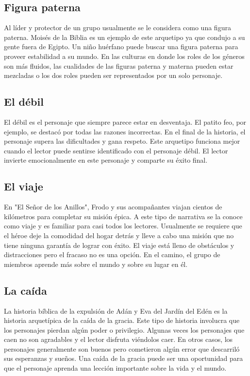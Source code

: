\subsection{Figura paterna}
Al líder y protector de un grupo usualmente se le considera como una figura
paterna. Moisés de la Biblia es un ejemplo de este arquetipo ya que condujo a su
gente fuera de Egipto. Un niño huérfano puede buscar una figura paterna para
proveer estabilidad a su mundo. En las culturas en donde los roles de los
géneros son más fluidos, las cualidades de las figuras paterna y materna pueden
estar mezcladas o los dos roles pueden ser representados por un solo personaje.

\subsection{El débil}
El débil es el personaje que siempre parece estar en desventaja. El patito feo,
por ejemplo, se destacó por todas las razones incorrectas. En el final de la
historia, el personaje supera las dificultades y gana respeto. Este arquetipo
funciona mejor cuando el lector puede sentirse identificado con el personaje
débil. El lector invierte emocionalmente en este personaje y comparte su éxito
final.

\subsection{El viaje}
En "El Señor de los Anillos", Frodo y sus acompañantes viajan cientos de
kilómetros para completar su misión épica. A este tipo de narrativa se la conoce
como viaje y es familiar para casi todos los lectores. Usualmente se requiere
que el héroe deje la comodidad del hogar detrás y lleve a cabo una misión que no
tiene ninguna garantía de lograr con éxito. El viaje está lleno de obstáculos y
distracciones pero el fracaso no es una opción. En el camino, el grupo de
miembros aprende más sobre el mundo y sobre su lugar en él.

\subsection{La caída}
La historia bíblica de la expulsión de Adán y Eva del Jardín del Edén es la
historia arquetípica de la caída de la gracia. Este tipo de historia involucra
que los personajes pierdan algún poder o privilegio. Algunas veces los
personajes que caen no son agradables y el lector disfruta viéndolos caer. En
otros casos, los personajes generalmente son buenos pero cometieron algún error
que descarriló sus esperanzas y sueños. Una caída de la gracia puede ser una
oportunidad para que el personaje aprenda una lección importante sobre la vida y
el mundo.
